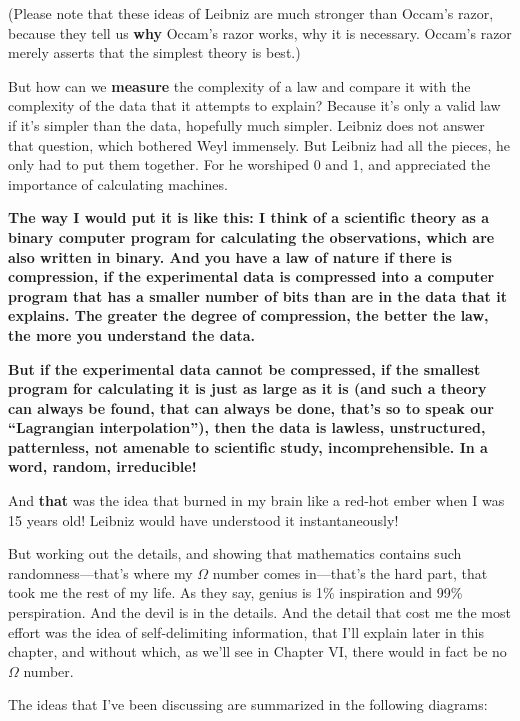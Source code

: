 \documentclass[12pt]{book}
\begin{document}
(Please note that these ideas of Leibniz are much stronger than Occam's razor, 
because they tell us \textbf{why} Occam's razor works, why it is necessary.
Occam's razor merely asserts that the simplest theory is best.)
 
But how can we \textbf{measure} the complexity of a law and compare it with the complexity of
the data that it attempts to explain?  
Because it's only a valid law if it's simpler than the data, hopefully much simpler.
Leibniz does not answer that question, which bothered
Weyl immensely.
But Leibniz had all the pieces, he only had to put them together. For he worshiped 0 and 1,
and appreciated the importance of calculating machines.
 
\textbf{
The way I would put it is like this: 
I think of a scientific theory as a binary computer program for calculating the observations,
which are also written in binary.
And you have a law of nature if there is compression, 
if the experimental data is compressed into a computer program that has a smaller 
number of bits 
than are in the data that it explains.
The greater the degree of compression, the better the law, the more you understand the data.
}
 
\textbf{
But if the experimental data cannot be compressed, if the smallest program for calculating
it is just as large as it is (and such a theory can always be found, that can always be done,
that's so to speak our ``Lagrangian interpolation''), 
then the data is lawless,
unstructured, patternless, not amenable to scientific study, incomprehensible.
In a word, random, irreducible!
}
 
And \textbf{that} was the idea that burned in my brain like a red-hot ember when I was 15 years old! 
Leibniz would have understood it instantaneously!
 
But working out the details, and showing that mathematics contains such randomness---that's 
where my $\Omega$ number comes in---that's the
hard part, that took me the rest of my life. As they say, genius is 1\% inspiration and 99\%
perspiration.  And the devil is in the details.  And the detail that cost me the most effort
was the idea of self-delimiting information, that I'll explain later in this chapter, and without
which, as we'll see in Chapter VI, there would in fact be no $\Omega$ number.
 
The ideas that I've been discussing are summarized in the following diagrams:
 
\end{document}
